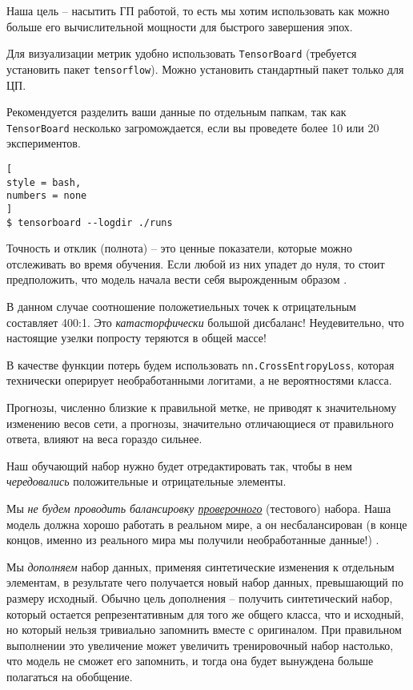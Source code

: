 \documentclass[%
	11pt,
	a4paper,
	utf8,
		]{article}
\begin{document}
Наша цель -- насытить ГП работой, то есть мы хотим использовать как можно больше его вычислительной мощности для быстрого завершения эпох.

Для визуализации метрик удобно использовать \verb|TensorBoard| (требуется установить пакет \verb|tensorflow|). Можно установить стандартный пакет только для ЦП.

Рекомендуется разделить ваши данные по отдельным папкам, так как \verb|TensorBoard| несколько загромождается, если вы проведете более 10 или 20 экспериментов. 
\begin{lstlisting}[
style = bash,
numbers = none
]
$ tensorboard --logdir ./runs
\end{lstlisting}

Точность и отклик (полнота) -- это ценные показатели, которые можно отслеживать во время обучения. Если любой из них упадет до нуля, то стоит предположить, что модель начала вести себя вырожденным образом \cite[]{pytorch-2022}.

В данном  случае соотношение положетиельных точек к отрицательным составляет 400:1. Это \emph{катасторфически} большой дисбаланс! Неудевительно, что настоящие узелки попросту теряются в общей массе!

В качестве функции потерь будем использовать \verb|nn.CrossEntropyLoss|, которая технически оперирует необработанными логитами, а не вероятностями класса.

Прогнозы, численно близкие к правильной метке, не приводят к значительному изменению весов сети, а прогнозы, значительно отличающиеся от правильного ответа, влияют на веса гораздо сильнее.

Наш обучающий набор нужно будет отредактировать так, чтобы в нем \emph{чередовались} положительные и отрицательные элементы.

Мы \emph{не будем проводить балансировку \underline{проверочного}} (тестового) набора. Наша модель должна хорошо работать в реальном мире, а он несбалансирован (в конце концов, именно из реального мира мы получили необработанные данные!) \cite[]{pytorch-2022}.

Мы \emph{дополняем} набор данных, применяя синтетические изменения к отдельным элементам, в результате чего получается новый набор данных, превышающий по размеру исходный. Обычно цель дополнения -- получить синтетический набор, который остается репрезентативным для того же общего класса, что и исходный, но который нельзя тривиально запомнить вместе с оригиналом. При правильном выполнении это увеличение может увеличить тренировочный набор настолько, что модель не сможет его запомнить, и тогда она будет вынуждена больше полагаться на обобщение.
\end{document}
